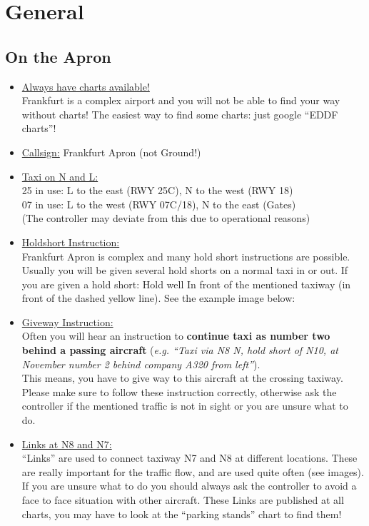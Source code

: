 
\section[general]{General}

\subsection[apron]{On the Apron}

\begin{itemize}
  \item \underline{Always have charts available!}\\ 
    Frankfurt is a complex airport and you will not be able to find your way without charts! 
    The easiest way to find some charts: just google “EDDF charts”!
  \item \underline{Callsign:} Frankfurt Apron (not Ground!)
  \item \underline{Taxi on N and L:}\\ 
    25 in use: L to the east (RWY 25C), N to the west (RWY 18)\\ 
    07 in use: L to the west (RWY 07C/18), N to the east (Gates)\\
    (The controller may deviate from this due to operational reasons)
  \item \underline{Holdshort Instruction:}\\
    Frankfurt Apron is complex and many hold short instructions are possible. 
    Usually you will be given several hold shorts on a normal taxi in or out.
    If you are given a hold short: Hold well In front of the mentioned taxiway (in front of the dashed yellow line). 
    See the example image below:
  \item \underline{Giveway Instruction:}\\
    Often you will hear an instruction to \textbf{continue taxi as number two behind a passing aircraft} 
    (\emph{e.g. “Taxi via N8 N, hold short of N10, at November number 2 behind company A320 from left”}).\\ 
    This means, you have to give way to this aircraft at the crossing taxiway. 
    Please make sure to follow these instruction correctly, otherwise ask the controller if the mentioned traffic is not in 
    sight or you are unsure what to do.
    
    
  \item \underline{Links at N8 and N7:}\\ 
    “Links” are used to connect taxiway N7 and N8 at different locations. 
    These are really important for the traffic flow, and are used quite often (see images). 
    If you are unsure what to do you should always ask the controller to avoid a face to face situation with other aircraft. 
    These Links are published at all charts, you may have to look at the “parking stands” chart to find them!
    

\end{itemize}

